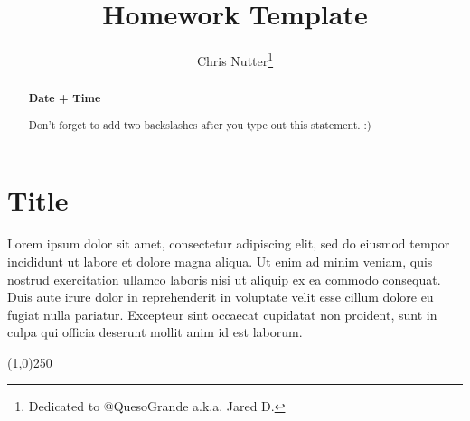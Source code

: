 \documentclass[12pt,a4paper]{article}
\title{Homework Template}
\author{Chris Nutter\thanks{Dedicated to @QuesoGrande a.k.a. Jared D.}}
\begin{document}
\maketitle

\begin{abstract}
    \noindent
    \begin{center}\textbf{Date + Time}\end{center}
        Don't forget to add two backslashes after you type out this statement. :) 
    
\end{abstract}

\tableofcontents    


\section{Title}
    Lorem ipsum dolor sit amet, consectetur adipiscing elit, sed do eiusmod tempor incididunt ut labore et dolore magna aliqua. Ut enim ad minim veniam, quis nostrud exercitation ullamco laboris nisi ut aliquip ex ea commodo consequat. Duis aute irure dolor in reprehenderit in voluptate velit esse cillum dolore eu fugiat nulla pariatur. Excepteur sint occaecat cupidatat non proident, sunt in culpa qui officia deserunt mollit anim id est laborum.
    \begin{center}\line(1,0){250}\end{center}

\end{document}
